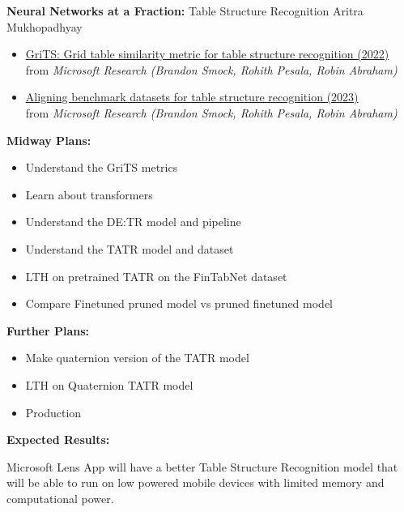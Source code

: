 \documentclass[
11pt,notheorems,hyperref={pdfauthor=Aritra Mukhopadhyay}
]{beamer}
\begin{document}
\begin{frame}{\textbf{Neural Networks at a Fraction:} Table Structure Recognition
}{Aritra Mukhopadhyay}
\begin{itemize}
    \item \href{https://arxiv.org/pdf/2103.12555}{GriTS: Grid table similarity metric for table structure recognition (2022)}\\
    from \textit{Microsoft Research (Brandon Smock, Rohith Pesala, Robin Abraham)}

    \item \href{https://arxiv.org/pdf/2303.00716}{Aligning benchmark datasets for table structure recognition (2023)}\\
    from \textit{Microsoft Research (Brandon Smock, Rohith Pesala, Robin Abraham)}
\end{itemize}



     
\end{frame}


\begin{frame}{}
    \alert{\textbf{Midway Plans:}}
    \begin{itemize}
        \item Understand the GriTS metrics
        \item Learn about transformers
        \item Understand the DE:TR model and pipeline
        \item Understand the TATR model and dataset
        \item LTH on pretrained TATR on the FinTabNet dataset
        \item Compare Finetuned pruned model vs pruned finetuned model
    \end{itemize}

    \alert{\textbf{Further Plans:}}
    \begin{itemize}
        \item Make quaternion version of the TATR model
        \item LTH on Quaternion TATR model
        \item Production
    \end{itemize}

    \alert{\textbf{Expected Results:}}

    Microsoft Lens App will have a better Table Structure Recognition model that will be able to run on low powered mobile devices with limited memory and computational power.

\end{frame}
\end{document}
